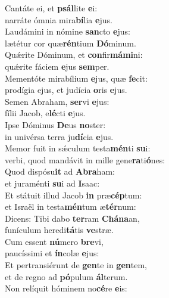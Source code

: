 \evenverse Cantáte ei, et \textbf{psál}lite \textbf{e}i:~\*\\
\evenverse narráte ómnia mira\textbf{bí}lia \textbf{e}jus.\\
\oddverse Laudámini in nómine \textbf{san}cto \textbf{e}jus:~\*\\
\oddverse lætétur cor quæ\textbf{rén}tium \textbf{Dó}minum.\\
\evenverse Quǽrite Dóminum, et \textbf{con}fir\textbf{má}\textbf{mi}ni:~\*\\
\evenverse quǽrite fáciem \textbf{e}jus \textbf{sem}per.\\
\oddverse Mementóte mirabílium \textbf{e}jus, quæ \textbf{fe}cit:~\*\\
\oddverse prodígia ejus, et judícia \textbf{o}ris \textbf{e}jus.\\
\evenverse Semen Abraham, \textbf{ser}vi \textbf{e}jus:~\*\\
\evenverse fílii Jacob, e\textbf{lé}cti \textbf{e}jus.\\
\oddverse Ipse Dóminus \textbf{De}us \textbf{no}ster:~\*\\
\oddverse in univérsa terra ju\textbf{dí}cia \textbf{e}jus.\\
\evenverse Memor fuit in sǽculum testa\textbf{mén}ti \textbf{su}i:~\*\\
\evenverse verbi, quod mandávit in mille gene\textbf{ra}ti\textbf{ó}nes:\\
\oddverse Quod dispósu\textbf{it} ad \textbf{A}\textbf{bra}ham:~\*\\
\oddverse et juraménti \textbf{su}i ad \textbf{I}saac:\\
\evenverse Et státuit illud Jacob \textbf{in} præ\textbf{cép}tum:~\*\\
\evenverse et Israël in testa\textbf{mén}tum æ\textbf{tér}num:\\
\oddverse Dicens: Tibi dabo \textbf{ter}ram \textbf{Chá}\textbf{na}an,~\*\\
\oddverse funículum heredi\textbf{tá}tis \textbf{ve}stræ.\\
\evenverse Cum essent \textbf{nú}mero \textbf{bre}vi,~\*\\
\evenverse paucíssimi et \textbf{ín}colæ \textbf{e}jus:\\
\oddverse Et pertransiérunt de \textbf{gen}te in \textbf{gen}tem,~\*\\
\oddverse et de regno ad \textbf{pó}pulum \textbf{ál}terum.\\
\evenverse Non relíquit hóminem no\textbf{cé}re \textbf{e}is:~\*\\
